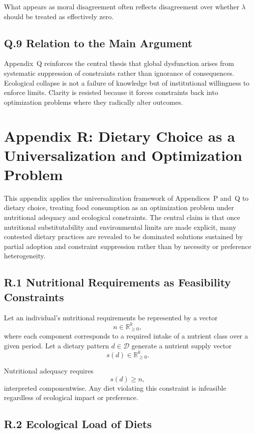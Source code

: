 \documentclass[11pt]{article}
\begin{document}
What appears as moral disagreement often reflects disagreement over whether \(\lambda\) should be treated as effectively zero.

\subsection{Q.9 Relation to the Main Argument}

Appendix~Q reinforces the central thesis that global dysfunction arises from systematic suppression of constraints rather than ignorance of consequences. Ecological collapse is not a failure of knowledge but of institutional willingness to enforce limits. Clarity is resisted because it forces constraints back into optimization problems where they radically alter outcomes.

\section{Appendix R: Dietary Choice as a Universalization and Optimization Problem}
\label{app:diet-detailed}

This appendix applies the universalization framework of Appendices~P and~Q to dietary choice, treating food consumption as an optimization problem under nutritional adequacy and ecological constraints. The central claim is that once nutritional substitutability and environmental limits are made explicit, many contested dietary practices are revealed to be dominated solutions sustained by partial adoption and constraint suppression rather than by necessity or preference heterogeneity.

\subsection{R.1 Nutritional Requirements as Feasibility Constraints}

Let an individual’s nutritional requirements be represented by a vector
\[
n \in \mathbb{R}^k_{\ge 0},
\]
where each component corresponds to a required intake of a nutrient class over a given period. Let a dietary pattern \(d \in \mathcal{D}\) generate a nutrient supply vector
\[
s(d) \in \mathbb{R}^k_{\ge 0}.
\]

Nutritional adequacy requires
\[
s(d) \ge n,
\]
interpreted componentwise. Any diet violating this constraint is infeasible regardless of ecological impact or preference.

\subsection{R.2 Ecological Load of Diets}
\end{document}
